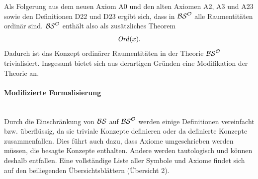 Als Folgerung aus dem neuen Axiom A0 und den alten Axiomen A2, A3 und A23 sowie den Definitionen D22 und D23 ergibt sich, dass in $\mathcal{BS}^{\mathcal{O}}$ alle Raumentitäten ordinär sind. $\mathcal{BS}^{\mathcal{O}}$ enthält also als zusätzliches Theorem
$$ \mathit{Ord}(x). $$
Dadurch ist das Konzept ordinärer Raumentitäten in der Theorie $\mathcal{BS}^{\mathcal{O}}$ trivialisiert. Insgesamt bietet sich aus derartigen Gründen eine Modifikation der Theorie an.

\paragraph{Modifizierte Formalisierung}\ \\
Durch die Einschränkung von $\mathcal{BS}$ auf $\mathcal{BS}^{\mathcal{O}}$ werden einige Definitionen vereinfacht bzw. überflüssig, da sie triviale Konzepte definieren oder da definierte Konzepte zusammenfallen.
Dies führt auch dazu, dass Axiome umgeschrieben werden müssen, die besagte Konzepte enthalten. 
Andere werden tautologisch und können deshalb entfallen.
Eine vollständige Liste aller Symbole und Axiome findet sich auf den beiliegenden Übersichtsblättern (Übersicht 2).

